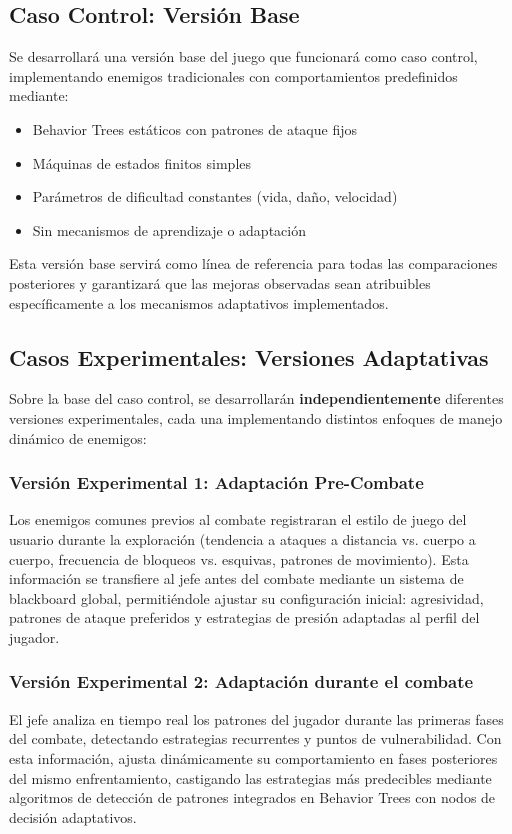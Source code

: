 \documentclass[informe]{upropuesta}
\begin{document}
\subsection{Caso Control: Versión Base}
Se desarrollará una versión base del juego que funcionará como caso control, implementando enemigos tradicionales con comportamientos predefinidos mediante:
\begin{itemize}
\item Behavior Trees estáticos con patrones de ataque fijos
\item Máquinas de estados finitos simples
\item Parámetros de dificultad constantes (vida, daño, velocidad)
\item Sin mecanismos de aprendizaje o adaptación
\end{itemize}
Esta versión base servirá como línea de referencia para todas las comparaciones posteriores y garantizará que las mejoras observadas sean atribuibles específicamente a los mecanismos adaptativos implementados.


\subsection{Casos Experimentales: Versiones Adaptativas}
Sobre la base del caso control, se desarrollarán \textbf{independientemente} diferentes versiones experimentales, cada una implementando distintos enfoques de manejo dinámico de enemigos:
\subsubsection*{Versión Experimental 1: Adaptación Pre-Combate}
Los enemigos comunes previos al combate registraran el estilo de juego del usuario durante la exploración (tendencia a ataques a distancia vs. cuerpo a cuerpo, frecuencia de bloqueos vs. esquivas, patrones de movimiento). Esta información se transfiere al jefe antes del combate mediante un sistema de blackboard global, permitiéndole ajustar su configuración inicial: agresividad, patrones de ataque preferidos y estrategias de presión adaptadas al perfil del jugador.

\subsubsection*{Versión Experimental 2: Adaptación durante el combate}
El jefe analiza en tiempo real los patrones del jugador durante las primeras fases del combate, detectando estrategias recurrentes y puntos de vulnerabilidad. Con esta información, ajusta dinámicamente su comportamiento en fases posteriores del mismo enfrentamiento, castigando las estrategias más predecibles mediante algoritmos de detección de patrones integrados en Behavior Trees con nodos de decisión adaptativos.
\end{document}
